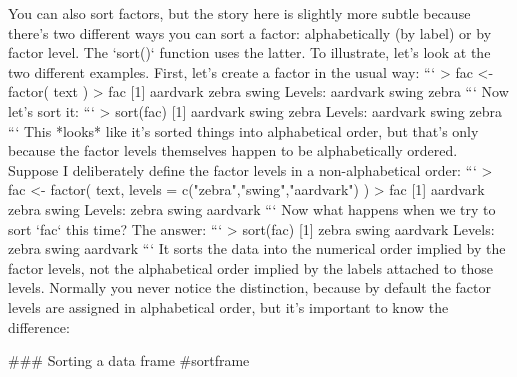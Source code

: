 You can also sort factors, but the story here is slightly more subtle because there's two different ways you can sort a factor: alphabetically (by label) or by factor level. The `sort()` function uses the latter. To illustrate, let's look at the two different examples. First, let's create a factor in the usual way:
```
> fac <- factor( text )
> fac
[1] aardvark zebra    swing   
Levels: aardvark swing zebra
```
Now let's sort it:
```
> sort(fac)
[1] aardvark swing    zebra   
Levels: aardvark swing zebra
```
This *looks* like it's sorted things into alphabetical order, but that's only because the factor levels themselves happen to be alphabetically ordered. Suppose I deliberately define the factor levels in a non-alphabetical order:
```
> fac <- factor( text, levels = c("zebra","swing","aardvark") )
> fac
[1] aardvark zebra    swing   
Levels: zebra swing aardvark
```
Now what happens when we try to sort `fac` this time? The answer:
```
> sort(fac)
[1] zebra    swing    aardvark
Levels: zebra swing aardvark
```
It sorts the data into the numerical order implied by the factor levels, not the alphabetical order implied by the labels attached to those levels. Normally you never notice the distinction, because by default the factor levels are assigned in alphabetical order, but it's important to know the difference:

### Sorting a data frame {#sortframe}

